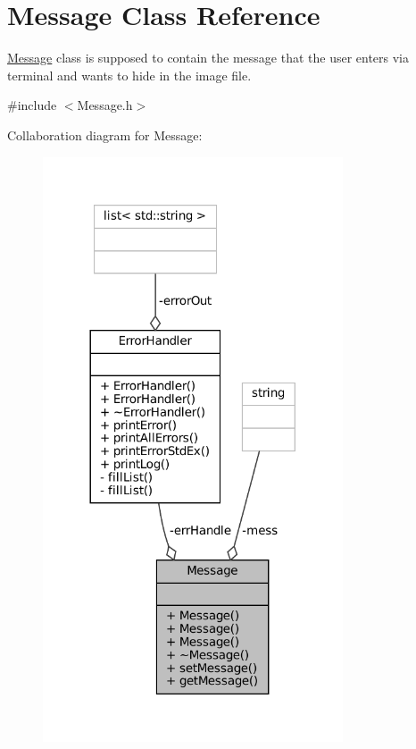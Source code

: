 \hypertarget{classMessage}{}\section{Message Class Reference}
\label{classMessage}


\mbox{\hyperlink{classMessage}{Message}} class is supposed to contain the message that the user enters via terminal and wants to hide in the image file.  




{\ttfamily \#include $<$Message.\+h$>$}



Collaboration diagram for Message\+:
\nopagebreak
\begin{figure}[H]
\begin{center}
\leavevmode
\includegraphics[width=252pt]{classMessage__coll__graph}
\end{center}
\end{figure}
